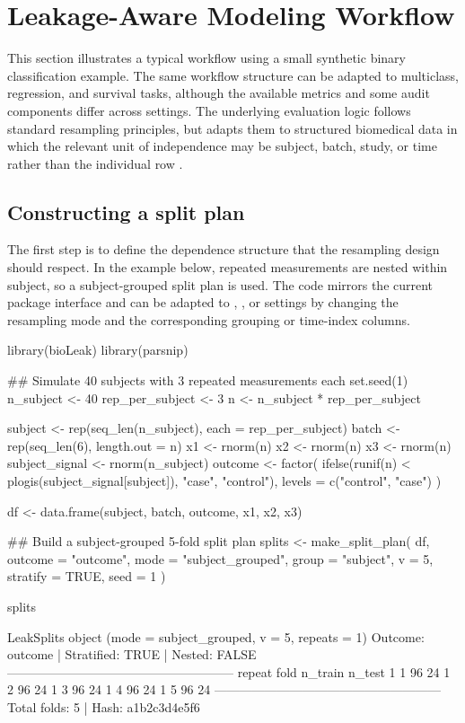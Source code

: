 \documentclass[article,shortnames]{jss}
\begin{document}
\section{Leakage-Aware Modeling Workflow}\label{sec:workflow}

This section illustrates a typical workflow using a small synthetic binary classification example. The same workflow structure can be adapted to multiclass, regression, and survival tasks, although the available metrics and some audit components differ across settings. The underlying evaluation logic follows standard resampling principles, but adapts them to structured biomedical data in which the relevant unit of independence may be subject, batch, study, or time rather than the individual row \citep{stone1974, kohavi1995, arlot2010}.

\subsection{Constructing a split plan}

The first step is to define the dependence structure that the resampling design should respect. In the example below, repeated measurements are nested within subject, so a subject-grouped split plan is used. The code mirrors the current package interface and can be adapted to , , or  settings by changing the resampling mode and the corresponding grouping or time-index columns.


\begin{CodeInput}
library(bioLeak)
library(parsnip)

## Simulate 40 subjects with 3 repeated measurements each
set.seed(1)
n_subject <- 40
rep_per_subject <- 3
n <- n_subject * rep_per_subject

subject <- rep(seq_len(n_subject), each = rep_per_subject)
batch <- rep(seq_len(6), length.out = n)
x1 <- rnorm(n)
x2 <- rnorm(n)
x3 <- rnorm(n)
subject_signal <- rnorm(n_subject)
outcome <- factor(
  ifelse(runif(n) < plogis(subject_signal[subject]), "case", "control"),
  levels = c("control", "case")
)

df <- data.frame(subject, batch, outcome, x1, x2, x3)

## Build a subject-grouped 5-fold split plan
splits <- make_split_plan(
  df,
  outcome = "outcome",
  mode = "subject_grouped",
  group = "subject",
  v = 5,
  stratify = TRUE,
  seed = 1
)

splits
\end{CodeInput}
\begin{CodeOutput}
LeakSplits object (mode = subject_grouped, v = 5, repeats = 1)
Outcome: outcome | Stratified: TRUE | Nested: FALSE
------------------------------------------------------
  repeat fold n_train n_test
       1    1      96     24
       1    2      96     24
       1    3      96     24
       1    4      96     24
       1    5      96     24
------------------------------------------------------
Total folds: 5 | Hash: a1b2c3d4e5f6
\end{CodeOutput}
\end{document}
